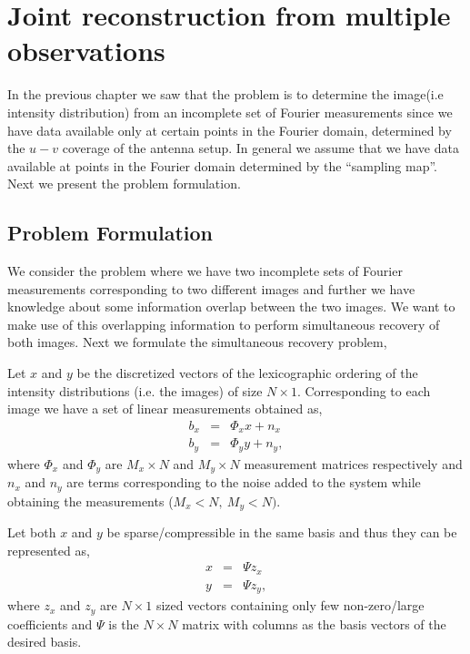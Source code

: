 \chapter{Joint reconstruction from multiple observations}
In the previous chapter we saw that the problem is to determine the image(i.e intensity distribution) from an incomplete set of Fourier measurements since we have data available only at certain points in the Fourier domain, determined by the $u-v$ coverage of the antenna setup. In general we assume that we have data available at points in the Fourier domain determined by the ``sampling map''.  Next we present the problem formulation.
\section{Problem Formulation}
We consider the problem where we have two incomplete sets of Fourier measurements corresponding to two different images and further we have knowledge about some information overlap between the two images. We want to make use of this overlapping information to perform simultaneous recovery of both images.  Next we formulate the simultaneous recovery problem,

 Let $x$ and $y$ be the discretized vectors of the lexicographic ordering of the intensity distributions (i.e. the images) of size $N \times 1$.
 Corresponding to each image we have a set of linear measurements obtained as,
 \begin{eqnarray}
  b_x &=& \Phi_x x  + n_x\\
  b_y   &=& \Phi_y y + n_y,
 \end{eqnarray}
where $\Phi_x$ and $\Phi_y$ are $M_x \times N$ and $M_y \times N$ measurement matrices respectively and $n_x$ and $n_y$ are terms corresponding to the noise added to the system while obtaining the measurements ($M_x < N, \ M_y < N)$. 

Let both $x$ and $y$ be sparse/compressible in the same basis and thus they can be represented as,
\begin{eqnarray}
	x &=& \Psi z_x 	\label{eq:domainx}\\
	y &=& \Psi z_y,
	\label{eq:domainy}
\end{eqnarray}
where $z_x$ and $z_y$ are $N \times 1$ sized vectors containing only few non-zero/large coefficients and $\Psi$ is the  $N \times N$  matrix with columns as the basis vectors of the desired basis. 

